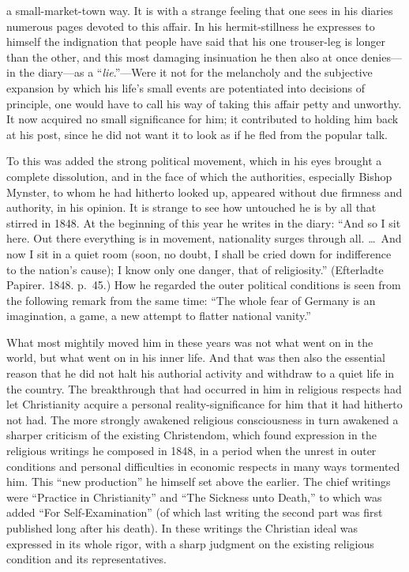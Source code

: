 \documentclass[12pt,a4paper]{book}
\newcommand{\opage}[1]{\marginnote{\footnotesize\textit{[#1]}}}
\begin{document}
a small-market-town way. It is with a strange feeling that one sees in
his diaries numerous pages devoted to this affair. In his
hermit-stillness he expresses to himself the indignation that people
have said that his one trouser-leg is longer than the other, and this
most damaging insinuation he then also at once denies---in the
diary---as a ``\textit{lie}.''---Were it not for the melancholy and the
subjective expansion by which his life's small events are potentiated
into decisions of principle, one would have to call his way of taking
this affair petty and unworthy. It now acquired no small significance
for him; it contributed to holding him back at his post, since he did
not want it to look as if he fled from the popular talk.

To this was added the strong political movement, which in his eyes
brought a complete dissolution, and in the face of which the
authorities, especially Bishop Mynster, to whom he had hitherto looked
up, appeared without due firmness and authority, in his opinion. It is
strange to see how untouched he is by all that stirred in 1848. At the
beginning of this year he writes in the diary: ``And so I sit here. Out
there everything is in movement, nationality surges through all. \dots\
And now I sit in a quiet room (soon, no doubt, I shall be cried down for
indifference to the nation's cause); I know only one danger, that of
religiosity.'' (Efterladte Papirer. 1848. p.~45.) How he regarded the
outer political conditions is seen from the following remark from the
same time: ``The whole
\opage{132}fear of Germany is an imagination, a game, a new attempt to
flatter national vanity.''

What most mightily moved him in these years was not what went on in the
world, but what went on in his inner life. And that was then also the
essential reason that he did not halt his authorial activity and
withdraw to a quiet life in the country. The breakthrough that had
occurred in him in religious respects had let Christianity acquire a
personal reality-significance for him that it had hitherto not had. The
more strongly awakened religious consciousness in turn awakened a
sharper criticism of the existing Christendom, which found expression in
the religious writings he composed in 1848, in a period when the unrest
in outer conditions and personal difficulties in economic respects in
many ways tormented him. This ``new production'' he himself set above
the earlier. The chief writings were ``Practice in Christianity'' and
``The Sickness unto Death,'' to which was added ``For Self-Examination''
(of which last writing the second part was first published long after
his death). In these writings the Christian ideal was expressed in its
whole rigor, with a sharp judgment on the existing religious condition
and its representatives.
\end{document}
